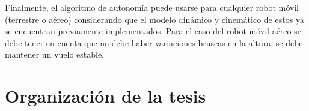 Finalmente, el algoritmo de autonom\'ia puede usarse para cualquier robot m\'ovil (terrestre o a\'ereo) considerando que el modelo din\'amico y cinem\'atico de estos ya se encuentran previamente implementados. Para el caso del robot m\'ovil a\'ereo se debe tener en cuenta que no debe haber variaciones bruscas en la altura, se debe mantener un vuelo estable.






\section{Organizaci\'on de la tesis}

